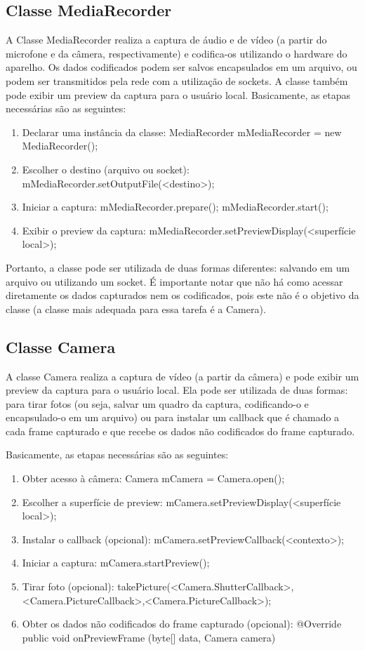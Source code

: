 \documentclass{acm_proc_article-sp}
\begin{document}
\subsection{Classe MediaRecorder}
A Classe MediaRecorder realiza a captura de áudio e de vídeo (a partir do microfone e da câmera, respectivamente) e codifica-os utilizando o hardware do aparelho. Os dados codificados podem ser salvos encapsulados em um arquivo, ou podem ser transmitidos pela rede com a utilização de sockets. A classe também pode exibir um preview da captura para o usuário local.
Basicamente, as etapas necessárias são as seguintes:
\begin{enumerate}
 \item Declarar uma instância da classe:
MediaRecorder mMediaRecorder = new MediaRecorder();
 \item Escolher o destino (arquivo ou socket):
mMediaRecorder.setOutputFile(<destino>);
 \item Iniciar a captura:
mMediaRecorder.prepare();
mMediaRecorder.start();
 \item Exibir o preview da captura:
mMediaRecorder.setPreviewDisplay(<superfície local>);
\end{enumerate}

Portanto, a classe pode ser utilizada de duas formas diferentes: salvando em um arquivo ou utilizando um socket. É importante notar que não há como acessar diretamente os dados capturados nem os codificados, pois este não é o objetivo da classe (a classe mais adequada para essa tarefa é a Camera).

\subsection{Classe Camera}
A classe Camera realiza a captura de vídeo (a partir da câmera) e pode exibir um preview da captura para o usuário local. Ela pode ser utilizada de duas formas: para tirar fotos (ou seja, salvar um quadro da captura, codificando-o e encapsulado-o em um arquivo) ou para instalar um callback que é chamado a cada frame capturado e que recebe os dados não codificados do frame capturado.

Basicamente, as etapas necessárias são as seguintes:
\begin{enumerate}
 \item Obter acesso à câmera:
Camera mCamera = Camera.open();
 \item Escolher a superfície de preview:
mCamera.setPreviewDisplay(<superfície local>);
 \item Instalar o callback (opcional):
mCamera.setPreviewCallback(<contexto>);
 \item Iniciar a captura:
mCamera.startPreview();
 \item Tirar foto (opcional):
takePicture(<Camera.ShutterCallback>,<Camera.PictureCallback>,<Camera.PictureCallback>);
 \item Obter os dados não codificados do frame capturado (opcional):
@Override public void onPreviewFrame (byte[] data, Camera camera){}
\end{enumerate}
\end{document}
